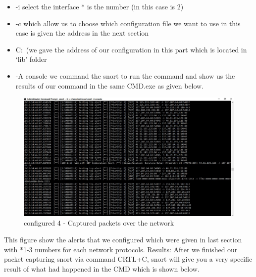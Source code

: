 \documentclass{article}
\begin{document}
\begin{itemize}
	
	\item -i select the interface * is the number (in this case is  2)
	\item -c which allow us to choose which configuration file we want to use in this case is given the address in the next section
	\item C:\ (we gave the address of our configuration in this part which is located in ‘lib’ folder
	\item -A console we command the snort to run the command and show us the results of our command in the same CMD.exe as given below. 
\end{itemize}



 


\begin{figure}[H]
	\begin{center}
		\includegraphics[width=0.6
\textwidth]{Conf4.jpg}
	\end{center}
	\caption{configured 4 - Captured packets over the network}
	\label{fig:Conf4}
\end{figure}


This figure show the alerts that we configured which were given in last section with *1-3 numbers for each network protocols.
Results:
After we finished our packet capturing snort via command CRTL+C, snort will give you a very specific result of what had happened in the CMD which is shown below.
\end{document}
